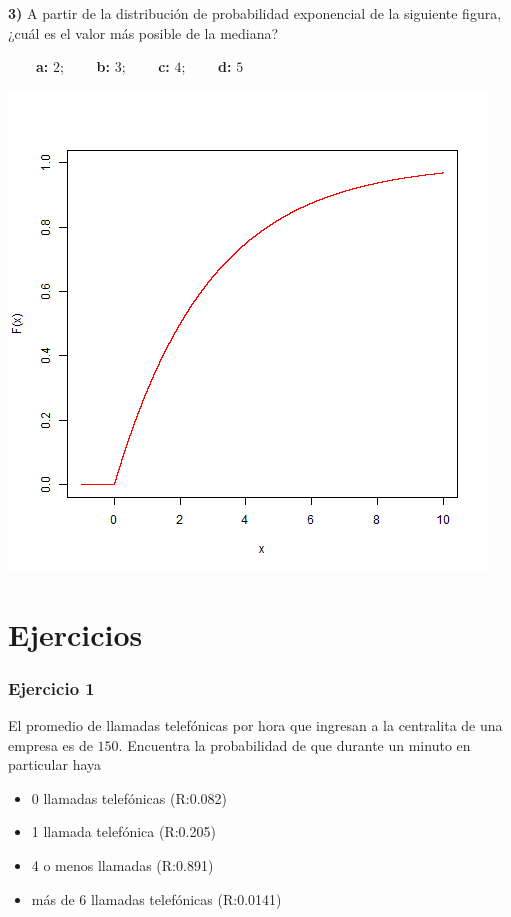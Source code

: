 \documentclass[
]{book}
\providecommand{\tightlist}{%
  \setlength{\itemsep}{0pt}\setlength{\parskip}{0pt}}
\begin{document}
\textbf{3)} A partir de la distribución de probabilidad exponencial de la siguiente figura, ¿cuál es el valor más posible de la mediana?

\textbf{\(\qquad\)a:} \(2\); \textbf{\(\qquad\)b:} \(3\); \textbf{\(\qquad\)c:} \(4\); \textbf{\(\qquad\)d:} \(5\)

\includegraphics{./figures/exp.png}

\hypertarget{ejercicios-6}{%
\section{Ejercicios}\label{ejercicios-6}}

\hypertarget{ejercicio-1-5}{%
\subsubsection{Ejercicio 1}\label{ejercicio-1-5}}

El promedio de llamadas telefónicas por hora que ingresan a la centralita de una empresa es de \(150\). Encuentra la probabilidad de que durante un minuto en particular haya

\begin{itemize}
\tightlist
\item
  0 llamadas telefónicas (R:0.082)
\item
  1 llamada telefónica (R:0.205)
\item
  4 o menos llamadas (R:0.891)
\item
  más de 6 llamadas telefónicas (R:0.0141)
\end{itemize}
\end{document}
